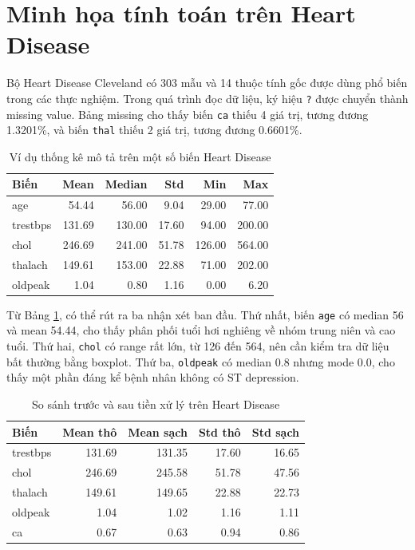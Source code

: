 \section{Minh họa tính toán trên Heart Disease}

Bộ Heart Disease Cleveland có 303 mẫu và 14 thuộc tính gốc được dùng phổ biến trong các thực nghiệm. Trong quá trình đọc dữ liệu, ký hiệu \texttt{?} được chuyển thành missing value. Bảng missing cho thấy biến \texttt{ca} thiếu 4 giá trị, tương đương 1.3201\%, và biến \texttt{thal} thiếu 2 giá trị, tương đương 0.6601\%.

\begin{table}[H]
\centering
\caption{Ví dụ thống kê mô tả trên một số biến Heart Disease}
\label{tab:chapter1_heart_stats}
\begin{tabular}{lrrrrr}
\toprule
Biến & Mean & Median & Std & Min & Max \\
\midrule
age & 54.44 & 56.00 & 9.04 & 29.00 & 77.00 \\
trestbps & 131.69 & 130.00 & 17.60 & 94.00 & 200.00 \\
chol & 246.69 & 241.00 & 51.78 & 126.00 & 564.00 \\
thalach & 149.61 & 153.00 & 22.88 & 71.00 & 202.00 \\
oldpeak & 1.04 & 0.80 & 1.16 & 0.00 & 6.20 \\
\bottomrule
\end{tabular}
\end{table}

Từ Bảng \ref{tab:chapter1_heart_stats}, có thể rút ra ba nhận xét ban đầu. Thứ nhất, biến \texttt{age} có median 56 và mean 54.44, cho thấy phân phối tuổi hơi nghiêng về nhóm trung niên và cao tuổi. Thứ hai, \texttt{chol} có range rất lớn, từ 126 đến 564, nên cần kiểm tra dữ liệu bất thường bằng boxplot. Thứ ba, \texttt{oldpeak} có median 0.8 nhưng mode 0.0, cho thấy một phần đáng kể bệnh nhân không có ST depression.

\begin{table}[H]
\centering
\caption{So sánh trước và sau tiền xử lý trên Heart Disease}
\label{tab:chapter1_preprocess_compare}
\small
\begin{tabular}{lrrrr}
\toprule
Biến & Mean thô & Mean sạch & Std thô & Std sạch \\
\midrule
trestbps & 131.69 & 131.35 & 17.60 & 16.65 \\
chol & 246.69 & 245.58 & 51.78 & 47.56 \\
thalach & 149.61 & 149.65 & 22.88 & 22.73 \\
oldpeak & 1.04 & 1.02 & 1.16 & 1.11 \\
ca & 0.67 & 0.63 & 0.94 & 0.86 \\
\bottomrule
\end{tabular}
\end{table}

